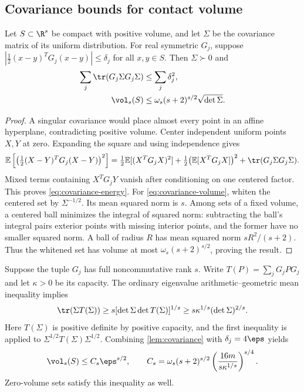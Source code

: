 \subsection{Covariance bounds for contact volume}

\begin{lemma}\label{lem:covariance}
Let $S\subset\R^s$ be compact with positive volume, and let $\Sigma$
be the covariance matrix of its uniform distribution. For real symmetric
$G_j$, suppose
$|\tfrac12(x-y)^TG_j(x-y)|\le\delta_j$ for all $x,y\in S$.
Then $\Sigma\succ0$ and
\begin{align}
 \sum_j\tr(G_j\Sigma G_j\Sigma)&\le\sum_j\delta_j^2,
 \label{eq:covariance-energy}\\
 \vol_s(S)&\le\omega_s(s+2)^{s/2}\sqrt{\det\Sigma}.
 \label{eq:covariance-volume}
\end{align}
\end{lemma}
\begin{proof}
A singular covariance would place almost every point in an affine
hyperplane, contradicting positive volume. Center independent uniform
points $X,Y$ at zero. Expanding the square and using independence gives
\[
 \mathbb E\left[\left(\tfrac12(X-Y)^TG_j(X-Y)\right)^2\right]
 =\tfrac12\mathbb E[(X^TG_jX)^2]
  +\tfrac12\bigl(\mathbb E[X^TG_jX]\bigr)^2
  +\tr(G_j\Sigma G_j\Sigma).
\]
Mixed terms containing $X^TG_jY$ vanish after conditioning on one
centered factor. This proves \eqref{eq:covariance-energy}.
For \eqref{eq:covariance-volume}, whiten the centered set by
$\Sigma^{-1/2}$. Its mean squared norm is $s$. Among sets of a fixed
volume, a centered ball minimizes the integral of squared norm:
subtracting the ball's integral pairs exterior points with missing
interior points, and the former have no smaller squared norm. A ball
of radius $R$ has mean squared norm $sR^2/(s+2)$. Thus the whitened
set has volume at most $\omega_s(s+2)^{s/2}$, proving the result.
\end{proof}

Suppose the tuple $G_j$ has full noncommutative rank $s$. Write
$T(P)=\sum_jG_jPG_j$ and let $\kappa>0$ be its capacity. The ordinary
eigenvalue arithmetic--geometric mean inequality implies
\begin{equation}\label{eq:energy-det}
 \tr(\Sigma T(\Sigma))
 \ge s[\det\Sigma\det T(\Sigma)]^{1/s}
 \ge s\kappa^{1/s}(\det\Sigma)^{2/s}.
\end{equation}
Here $T(\Sigma)$ is positive definite by positive capacity, and the
first inequality is applied to $\Sigma^{1/2}T(\Sigma)\Sigma^{1/2}$.
Combining \cref{lem:covariance} with $\delta_j=4\eps$ yields
\begin{equation}\label{eq:ncrank-volume}
 \vol_s(S)\le C_s\eps^{s/2},\qquad
 C_s=\omega_s(s+2)^{s/2}
       \left(\frac{16m}{s\kappa^{1/s}}\right)^{s/4}.
\end{equation}
Zero-volume sets satisfy this inequality as well.

